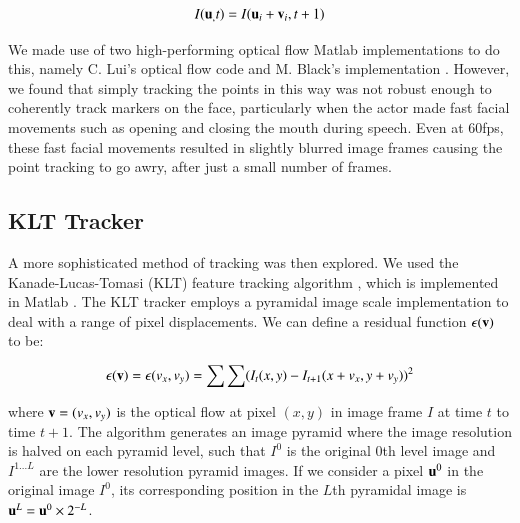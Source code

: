 \begin{equation}
\label{eq:opticalflow}
\begin{aligned}
I(\mathbf{u}_, t) = 
I(\mathbf{u}_i + \mathbf{v}_i, t+1)
\end{aligned}
\end{equation}

We made use of two high-performing optical flow Matlab implementations to do this, namely C. Lui's optical flow code \cite{Lui:2011} and M. Black's implementation \cite{Black:2010}. However, we found that simply tracking the points in this way was not robust enough to coherently track markers on the face, particularly when the actor made fast facial movements such as opening and closing the mouth during speech. Even at 60fps, these fast facial movements resulted in slightly blurred image frames causing the point tracking to go awry, after just a small number of frames.

\subsection{KLT Tracker}

A more sophisticated method of tracking was then explored. We used the Kanade-Lucas-Tomasi (KLT) feature tracking algorithm \cite{Shi:1994}, which is implemented in Matlab \cite{KLTMatlab}. The KLT tracker employs a pyramidal image scale implementation to deal with a range of pixel displacements. We can define a residual function $\epsilon (\mathbf{v})$ to be:

\begin{equation}
\label{eq:KLT}
\begin{aligned}
\epsilon (\mathbf{v}) = 
\epsilon (v_x, v_y) = 
\sum
\sum
(I_t(x,y) - I_{t+1}(x + v_x, y + v_y))^2
\end{aligned}
\end{equation}

where $\mathbf{v} = (v_x, v_y)$ is the optical flow at pixel $(x, y)$ in image frame $I$ at time $t$ to time $t+1$. The algorithm generates an image pyramid where the image resolution is halved on each pyramid level, such that $I^0$ is the original $0$th level image and $I^{1...L}$ are the lower resolution pyramid images. If we consider a pixel $\mathbf{u}^0$ in the original image $I^0$, its corresponding position in the $L$th pyramidal image is $\mathbf{u}^L = \mathbf{u}^0  \times 2^{-L}$.

